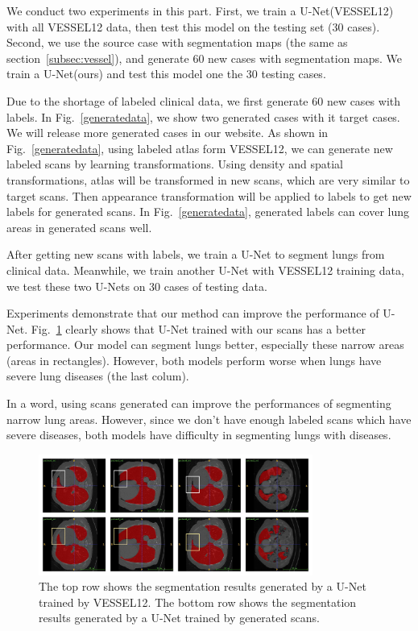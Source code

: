 \documentclass{article}
\begin{document}
We conduct two experiments in this part.
First, we train a U-Net(VESSEL12) with all VESSEL12 data, then test this model on the testing set (30 cases).
Second, we use the source case with segmentation maps (the same as section~\ref{subsec:vessel}), and generate 60 new cases with segmentation maps. We train a U-Net(ours) and test this model one the 30 testing cases.

Due to the shortage of labeled clinical data, we first generate 60 new cases with labels. In Fig.~\ref{generatedata}, we show two generated cases with it target cases. We will release more generated cases in our website. As shown in Fig.~\ref{generatedata}, using labeled atlas form VESSEL12, we can generate new labeled scans by learning transformations. Using density and spatial transformations, atlas will be transformed in new scans, which are very similar to target scans. Then appearance transformation will be applied to labels to get new labels for generated scans. In Fig.~\ref{generatedata}, generated labels can cover lung areas in generated scans well.

After getting new scans with labels, we train a U-Net to segment lungs from clinical data. Meanwhile, we train another U-Net with VESSEL12 training data, we test these two U-Nets on 30 cases of testing data. 

Experiments demonstrate that our method can improve the performance of U-Net. Fig.~\ref{lungs} clearly shows that U-Net trained with our scans has a better performance. Our model can segment lungs better, especially these narrow areas (areas in rectangles). However, both models perform worse when lungs have severe lung diseases (the last colum).

In a word, using scans generated can improve the performances of segmenting narrow lung areas. However, since we don't have enough labeled scans which have severe diseases, both models have difficulty in segmenting lungs with diseases.


\begin{figure}[t]
    \centerline{\includegraphics[width=90mm]{lungs.pdf}}
    \vspace{-0cm}
    \caption{The top row shows the segmentation results generated by a U-Net trained by VESSEL12. The bottom row shows the segmentation results generated by a U-Net trained by generated scans. 
    }
    \vspace{-0cm}
    \label{lungs}
    \end{figure}
\end{document}
